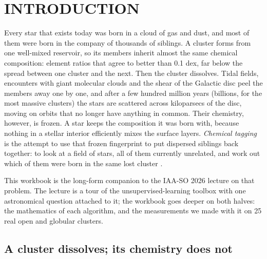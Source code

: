 \section{INTRODUCTION}
\label{sec:intro}


Every star that exists today was born in a cloud of gas and dust, and most of
them were born in the company of thousands of siblings. A cluster forms from
one well-mixed reservoir, so its members inherit almost the same chemical
composition: element ratios that agree to better than 0.1 dex, far below the
spread between one cluster and the next. Then the cluster dissolves. Tidal
fields, encounters with giant molecular clouds and the shear of the Galactic
disc peel the members away one by one, and after a few hundred million years
(billions, for the most massive clusters) the stars are scattered across
kiloparsecs of the disc, moving on orbits that no longer have anything in
common. Their chemistry, however, is frozen. A star keeps the composition it
was born with, because nothing in a stellar interior efficiently mixes the
surface layers. \emph{Chemical tagging} is the attempt to use that frozen
fingerprint to put dispersed siblings back together: to look at a field of
stars, all of them currently unrelated, and work out which of them were born in
the same lost cluster \citep{Freeman:02, BlandHawthorn:16}.

This workbook is the long-form companion to the IAA-SO 2026 lecture on that
problem. The lecture is a tour of the unsupervised-learning toolbox with one
astronomical question attached to it; the workbook goes deeper on both halves:
the mathematics of each algorithm, and the measurements we made with it on 25
real open and globular clusters.

\begin{marginnote}[]
\end{marginnote}

\subsection{A cluster dissolves; its chemistry does not}


